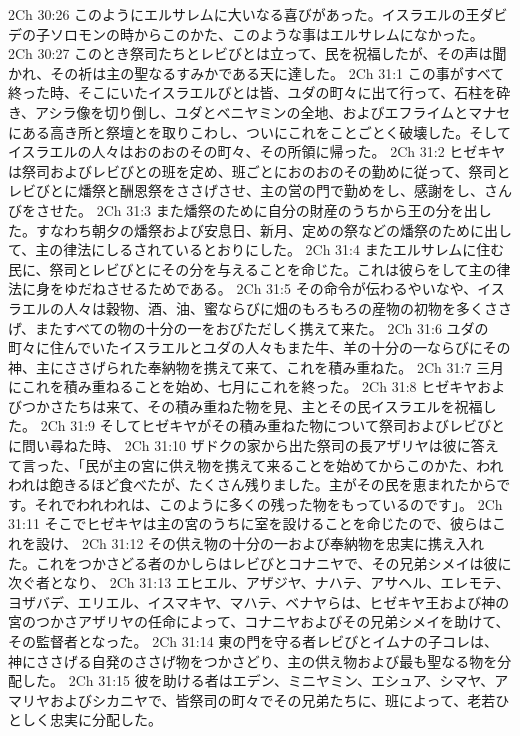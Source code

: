 2Ch 30:26  このようにエルサレムに大いなる喜びがあった。イスラエルの王ダビデの子ソロモンの時からこのかた、このような事はエルサレムになかった。
2Ch 30:27  このとき祭司たちとレビびとは立って、民を祝福したが、その声は聞かれ、その祈は主の聖なるすみかである天に達した。
2Ch 31:1  この事がすべて終った時、そこにいたイスラエルびとは皆、ユダの町々に出て行って、石柱を砕き、アシラ像を切り倒し、ユダとベニヤミンの全地、およびエフライムとマナセにある高き所と祭壇とを取りこわし、ついにこれをことごとく破壊した。そしてイスラエルの人々はおのおのその町々、その所領に帰った。
2Ch 31:2  ヒゼキヤは祭司およびレビびとの班を定め、班ごとにおのおのその勤めに従って、祭司とレビびとに燔祭と酬恩祭をささげさせ、主の営の門で勤めをし、感謝をし、さんびをさせた。
2Ch 31:3  また燔祭のために自分の財産のうちから王の分を出した。すなわち朝夕の燔祭および安息日、新月、定めの祭などの燔祭のために出して、主の律法にしるされているとおりにした。
2Ch 31:4  またエルサレムに住む民に、祭司とレビびとにその分を与えることを命じた。これは彼らをして主の律法に身をゆだねさせるためである。
2Ch 31:5  その命令が伝わるやいなや、イスラエルの人々は穀物、酒、油、蜜ならびに畑のもろもろの産物の初物を多くささげ、またすべての物の十分の一をおびただしく携えて来た。
2Ch 31:6  ユダの町々に住んでいたイスラエルとユダの人々もまた牛、羊の十分の一ならびにその神、主にささげられた奉納物を携えて来て、これを積み重ねた。
2Ch 31:7  三月にこれを積み重ねることを始め、七月にこれを終った。
2Ch 31:8  ヒゼキヤおよびつかさたちは来て、その積み重ねた物を見、主とその民イスラエルを祝福した。
2Ch 31:9  そしてヒゼキヤがその積み重ねた物について祭司およびレビびとに問い尋ねた時、
2Ch 31:10  ザドクの家から出た祭司の長アザリヤは彼に答えて言った、「民が主の宮に供え物を携えて来ることを始めてからこのかた、われわれは飽きるほど食べたが、たくさん残りました。主がその民を恵まれたからです。それでわれわれは、このように多くの残った物をもっているのです」。
2Ch 31:11  そこでヒゼキヤは主の宮のうちに室を設けることを命じたので、彼らはこれを設け、
2Ch 31:12  その供え物の十分の一および奉納物を忠実に携え入れた。これをつかさどる者のかしらはレビびとコナニヤで、その兄弟シメイは彼に次ぐ者となり、
2Ch 31:13  エヒエル、アザジヤ、ナハテ、アサヘル、エレモテ、ヨザバデ、エリエル、イスマキヤ、マハテ、ベナヤらは、ヒゼキヤ王および神の宮のつかさアザリヤの任命によって、コナニヤおよびその兄弟シメイを助けて、その監督者となった。
2Ch 31:14  東の門を守る者レビびとイムナの子コレは、神にささげる自発のささげ物をつかさどり、主の供え物および最も聖なる物を分配した。
2Ch 31:15  彼を助ける者はエデン、ミニヤミン、エシュア、シマヤ、アマリヤおよびシカニヤで、皆祭司の町々でその兄弟たちに、班によって、老若ひとしく忠実に分配した。
